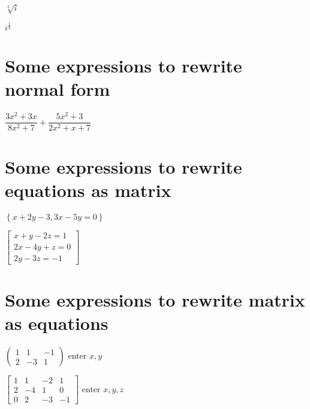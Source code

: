 \documentclass{article}
\begin{document}
$\sqrt[3]{i}$

$i^{\frac{1}{3}}$

\section{Some expressions to rewrite normal form}

$\dfrac{3x^{2}+3x}{8x^{2}+7}+\dfrac{5x^{2}+3}{2x^{2}+x+7}$

\section{Some expressions to rewrite equations as matrix}

$\left\{ x+2y-3,3x-5y=0\right\} $

$\left[ 
\begin{array}{l}
x+y-2z=1 \\ 
2x-4y+z=0 \\ 
2y-3z=-1%
\end{array}%
\right] $

\section{Some expressions to rewrite matrix as equations}

$\left( 
\begin{array}{ccc}
1 & 1 & -1 \\ 
2 & -3 & 1%
\end{array}%
\right) $ enter $x,y$

$\left[ 
\begin{array}{cccc}
1 & 1 & -2 & 1 \\ 
2 & -4 & 1 & 0 \\ 
0 & 2 & -3 & -1%
\end{array}%
\right] $ enter $x,y,z$
\end{document}
